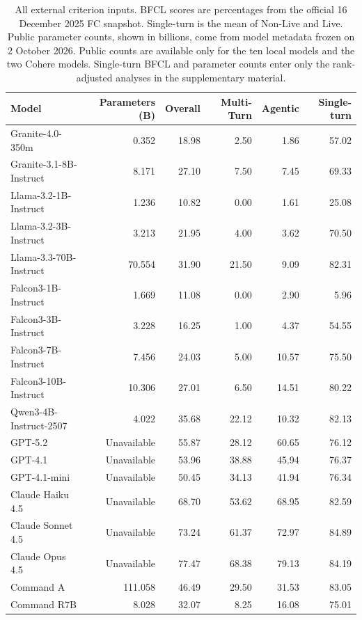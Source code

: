\begin{table}[t]
\centering
\footnotesize
\setlength{\tabcolsep}{3pt}
\begin{tabular}{lrrrrr}
\toprule
Model & Parameters (B) & Overall & Multi-Turn & Agentic & Single-turn \\
\midrule
Granite-4.0-350m & 0.352 & 18.98 & 2.50 & 1.86 & 57.02 \\
Granite-3.1-8B-Instruct & 8.171 & 27.10 & 7.50 & 7.45 & 69.33 \\
Llama-3.2-1B-Instruct & 1.236 & 10.82 & 0.00 & 1.61 & 25.08 \\
Llama-3.2-3B-Instruct & 3.213 & 21.95 & 4.00 & 3.62 & 70.50 \\
Llama-3.3-70B-Instruct & 70.554 & 31.90 & 21.50 & 9.09 & 82.31 \\
Falcon3-1B-Instruct & 1.669 & 11.08 & 0.00 & 2.90 & 5.96 \\
Falcon3-3B-Instruct & 3.228 & 16.25 & 1.00 & 4.37 & 54.55 \\
Falcon3-7B-Instruct & 7.456 & 24.03 & 5.00 & 10.57 & 75.50 \\
Falcon3-10B-Instruct & 10.306 & 27.01 & 6.50 & 14.51 & 80.22 \\
Qwen3-4B-Instruct-2507 & 4.022 & 35.68 & 22.12 & 10.32 & 82.13 \\
GPT-5.2 & Unavailable & 55.87 & 28.12 & 60.65 & 76.12 \\
GPT-4.1 & Unavailable & 53.96 & 38.88 & 45.94 & 76.37 \\
GPT-4.1-mini & Unavailable & 50.45 & 34.13 & 41.94 & 76.34 \\
Claude Haiku 4.5 & Unavailable & 68.70 & 53.62 & 68.95 & 82.59 \\
Claude Sonnet 4.5 & Unavailable & 73.24 & 61.37 & 72.97 & 84.89 \\
Claude Opus 4.5 & Unavailable & 77.47 & 68.38 & 79.13 & 84.19 \\
Command A & 111.058 & 46.49 & 29.50 & 31.53 & 83.05 \\
Command R7B & 8.028 & 32.07 & 8.25 & 16.08 & 75.01 \\
\bottomrule
\end{tabular}
\caption{All external criterion inputs. BFCL scores are percentages from the official 16 December 2025 FC snapshot. Single-turn is the mean of Non-Live and Live. Public parameter counts, shown in billions, come from model metadata frozen on 2 October 2026. Public counts are available only for the ten local models and the two Cohere models. Single-turn BFCL and parameter counts enter only the rank-adjusted analyses in the supplementary material.}
\label{tab:criterion-inputs}
\end{table}
